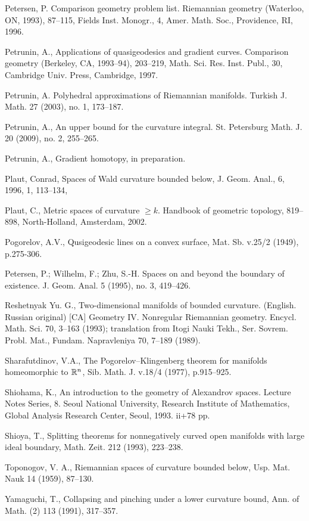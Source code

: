 \documentclass{article}
\begin{document}
\begin{thebibliography}{Bibliography}
Petersen, P.
Comparison geometry problem list. 
Riemannian geometry (Waterloo, ON, 1993), 87--115,
Fields Inst. Monogr., 4, Amer. Math. Soc., Providence, RI, 1996. 

Petrunin, A., 
Applications of quasigeodesics and gradient curves.  
Comparison geometry (Berkeley, CA, 1993--94),  203--219,
Math. Sci. Res. Inst. Publ., 30, Cambridge Univ. Press, Cambridge, 1997.

Petrunin, A. 
Polyhedral approximations of Riemannian manifolds.  
Turkish J. Math.  27  (2003),  no. 1, 173--187.

Petrunin, A., 
An upper bound for the curvature integral. 
St. Petersburg Math. J. 20 (2009), no. 2, 255--265.

Petrunin, A., 
Gradient homotopy, 
in preparation.

 {Plaut, Conrad},
      {Spaces of Wald curvature bounded below},
    {J. Geom. Anal.},
     {6},
     {1996},
     {1},
      {113--134},

Plaut, C., 
Metric spaces of curvature $\ge k$. 
Handbook of geometric topology,  
819--898, North-Holland, Amsterdam, 2002.

 Pogorelov, A.V., 
Qusigeodesic lines on a convex surface, Mat. Sb. v.25/2
(1949), p.275-306.

Petersen, P.; Wilhelm, F.;
Zhu, S.-H.
Spaces on and beyond the boundary of existence. 
J. Geom. Anal. 5 (1995), no. 3, 419--426.

Reshetnyak Yu. G., Two-dimensional manifolds of bounded curvature. (English. Russian
original) [CA] Geometry IV. Nonregular Riemannian geometry. Encycl. Math. Sci. 70,
3--163 (1993); translation from Itogi Nauki Tekh., Ser. Sovrem. Probl. Mat., Fundam.
Napravleniya 70, 7--189 (1989).

Sharafutdinov, V.A., 
The Pogorelov--Klingenberg
theorem for manifolds homeomorphic to $\mathbb{R}^n$, Sib. Math. J. v.18/4 (1977),
p.915--925.

Shiohama, K., 
An introduction to the geometry of
Alexandrov spaces. 
Lecture Notes Series, 8. Seoul National University, Research
Institute of Mathematics, Global Analysis Research Center, Seoul, 1993. ii+78
pp.

  Shioya, T., 
Splitting theorems for nonnegatively curved open manifolds
with large ideal boundary, Math. Zeit. 212 (1993), 223--238.

Toponogov, V. A.,
Riemannian spaces of curvature bounded below,
Usp. Mat. Nauk 14 (1959), 87--130.

 Yamaguchi, T., 
Collapsing and pinching under a lower curvature
bound, Ann. of Math. (2) 113 (1991), 317--357.
\end{thebibliography}
\end{document}
